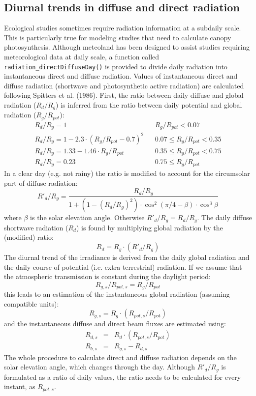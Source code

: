 \documentclass[11pt,a4paper]{article}
\begin{document}
\subsection{Diurnal trends in diffuse and direct radiation}
Ecological studies sometimes require radiation information at a subdaily scale. This is particularly true for modeling studies that need to calculate canopy photosynthesis. Although meteoland has been designed to assist studies requiring meteorological data at daily scale, a function called \texttt{radiation\_directDiffuseDay()} is provided to divide daily radiation into instantaneous direct and diffuse radiation. Values of instantaneous direct and diffuse radiation (shortwave and photosynthetic active radiation) are calculated following Spitters et al. (1986). First, the ratio between daily diffuse and global radiation ($R_{d}/R_{g}$) is inferred from the ratio between daily potential and global radiation ($R_{g}/R_{pot}$):
\begin{eqnarray}
R_{d}/R_{g} = 1 & & R_{g}/R_{pot}<0.07\\
R_{d}/R_{g} = 1-2.3\cdot (R_{g}/R_{pot}-0.7)^2 & & 0.07\leq R_{g}/R_{pot} <0.35\\
R_{d}/R_{g} = 1.33-1.46\cdot R_{g}/R_{pot} & & 0.35\leq R_{g}/R_{pot} <0.75\\
R_{d}/R_{g} = 0.23 & & 0.75\leq R_{g}/R_{pot}
\end{eqnarray}
In a clear day (e.g. not rainy) the ratio is modified to account for the circumsolar part of diffuse radiation:
\begin{equation}
R'_{d}/R_{g} = \frac{R_{d}/R_{g}}{1+(1- (R_{d}/R_{g})^2)\cdot \cos^2(\pi/4-\beta)\cdot \cos^3\beta} 
\end{equation}
where $\beta$ is the solar elevation angle. Otherwise $R'_{d}/R_{g} = R_{d}/R_{g}$. The daily diffuse shortwave radiation ($R_{d}$) is found by multiplying global radiation by the (modified) ratio:
\begin{equation}
R_{d} = R_{g} \cdot (R'_{d}/R_{g}) 
\end{equation}
The diurnal trend of the irradiance is derived from the daily global radiation and the daily course of potential (i.e. extra-terrestrial) radiation. If we assume that the atmospheric transmission is constant during the daylight period:
\begin{equation}
R_{g,s}/R_{pot,s} =R_{g}/R_{pot}
\end{equation}
this leads to an estimation of the instantaneous global radiation (assuming compatible units):
\begin{equation}
R_{g,s} = R_{g}\cdot (R_{pot,s}/R_{pot})
\end{equation}
and the instantaneous diffuse and direct beam fluxes are estimated using:
\begin{eqnarray}
R_{d,s} &=& R_{d}\cdot (R_{pot,s}/R_{pot}) \\
R_{b,s} &=& R_{g,s} - R_{d,s}
\end{eqnarray}
The whole procedure to calculate direct and diffuse radiation depends on the solar elevation angle, which changes through the day. Although $R'_{d}/R_{g}$ is formulated as a ratio of daily values, the ratio needs to be calculated for every instant, as $R_{pot,s}$.
\end{document}
